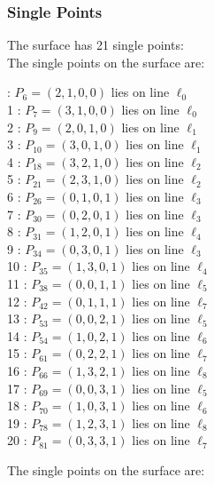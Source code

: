 \documentclass{article}
\begin{document}
{\subsubsection*{Single Points}
The surface has 21 single points:\\
The single points on the surface are:\\
\begin{multicols}{2}
 : $P_{6}=( 2, 1, 0, 0 )$ lies on line $\ell_{0}$\\
1 : $P_{7}=( 3, 1, 0, 0 )$ lies on line $\ell_{0}$\\
2 : $P_{9}=( 2, 0, 1, 0 )$ lies on line $\ell_{1}$\\
3 : $P_{10}=( 3, 0, 1, 0 )$ lies on line $\ell_{1}$\\
4 : $P_{18}=( 3, 2, 1, 0 )$ lies on line $\ell_{2}$\\
5 : $P_{21}=( 2, 3, 1, 0 )$ lies on line $\ell_{2}$\\
6 : $P_{26}=( 0, 1, 0, 1 )$ lies on line $\ell_{3}$\\
7 : $P_{30}=( 0, 2, 0, 1 )$ lies on line $\ell_{3}$\\
8 : $P_{31}=( 1, 2, 0, 1 )$ lies on line $\ell_{4}$\\
9 : $P_{34}=( 0, 3, 0, 1 )$ lies on line $\ell_{3}$\\
10 : $P_{35}=( 1, 3, 0, 1 )$ lies on line $\ell_{4}$\\
11 : $P_{38}=( 0, 0, 1, 1 )$ lies on line $\ell_{5}$\\
12 : $P_{42}=( 0, 1, 1, 1 )$ lies on line $\ell_{7}$\\
13 : $P_{53}=( 0, 0, 2, 1 )$ lies on line $\ell_{5}$\\
14 : $P_{54}=( 1, 0, 2, 1 )$ lies on line $\ell_{6}$\\
15 : $P_{61}=( 0, 2, 2, 1 )$ lies on line $\ell_{7}$\\
16 : $P_{66}=( 1, 3, 2, 1 )$ lies on line $\ell_{8}$\\
17 : $P_{69}=( 0, 0, 3, 1 )$ lies on line $\ell_{5}$\\
18 : $P_{70}=( 1, 0, 3, 1 )$ lies on line $\ell_{6}$\\
19 : $P_{78}=( 1, 2, 3, 1 )$ lies on line $\ell_{8}$\\
20 : $P_{81}=( 0, 3, 3, 1 )$ lies on line $\ell_{7}$\\
\end{multicols}
The single points on the surface are:\\
}
\end{document}
